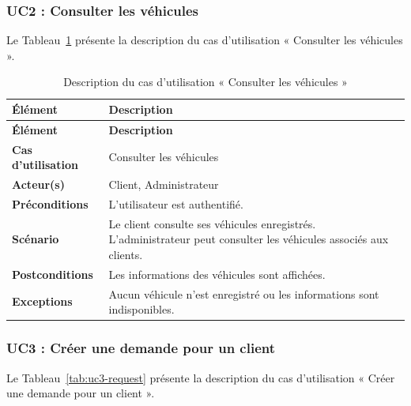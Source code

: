 \subsubsection{UC2 : Consulter les véhicules}

Le Tableau~\ref{tab:uc2-vehicles} présente la description du cas d'utilisation « Consulter les véhicules ».

\begin{longtable}{|>{\RaggedRight\arraybackslash}p{4cm}|>{\RaggedRight\arraybackslash}p{10.5cm}|}

\caption{Description du cas d'utilisation « Consulter les véhicules »}
\label{tab:uc2-vehicles}\\

\hline
\textbf{Élément} & \textbf{Description} \\
\hline
\endfirsthead

\hline
\textbf{Élément} & \textbf{Description} \\
\hline
\endhead

\textbf{Cas d'utilisation} &
Consulter les véhicules \\
\hline

\textbf{Acteur(s)} &
Client, Administrateur \\
\hline

\textbf{Préconditions} &
L'utilisateur est authentifié. \\
\hline

\textbf{Scénario} &
Le client consulte ses véhicules enregistrés. L'administrateur peut consulter les véhicules associés aux clients. \\
\hline

\textbf{Postconditions} &
Les informations des véhicules sont affichées. \\
\hline

\textbf{Exceptions} &
Aucun véhicule n'est enregistré ou les informations sont indisponibles. \\
\hline

\end{longtable}


\subsubsection{UC3 : Créer une demande pour un client}

Le Tableau~\ref{tab:uc3-request} présente la description du cas d'utilisation « Créer une demande pour un client ».

